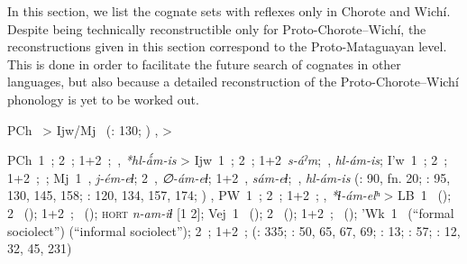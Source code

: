 \begin{adjustwidth}{6mm}{0pt}
\largerpage
In this section, we list the cognate sets with reflexes only in Chorote and Wichí. Despite being technically reconstructible only for Proto-Chorote–Wichí, the reconstructions given in this section correspond to the Proto-Mataguayan level. This is done in order to facilitate the future search of cognates in other languages, but also because a detailed reconstruction of the Proto-Chorote–Wichí phonology is yet to be worked out.


PCh~ > Ijw/Mj~ (\citealt{ND09}: 130; \citealt{JC18}) {\sep}  >  \citep[72]{KC16}


PCh~1~; 2~; 1+2~;~, \textit{*hl\mbox{-}ǻm\mbox{-}is} > Ijw~1~; 2~; 1+2~\textit{s\mbox{-}áˀm};~, \textit{hl\mbox{-}ám\mbox{-}is}; I’w~1~; 2~; 1+2~;~; Mj~1~, \textit{j\mbox{-}ém\mbox{-}eɬ}; 2~, \textit{∅\mbox{-}ám\mbox{-}eɬ}; 1+2~, \textit{sám\mbox{-}eɬ};~, \textit{hl\mbox{-}ám\mbox{-}is} (\citealt{JC14b}: 90, fn. 20; \citealt{ND09}: 95, 130, 145, 158; \citealt{AG83}: 120, 134, 157, 174; \citealt{JC18}) {\sep} PW~1~; 2~; 1+2~; , \textit{*ɬ\mbox{-}ám\mbox{-}elʰ} > LB~1~ (); 2~ (); 1+2~;~ (); \textsc{hort} \textit{n\mbox{-}am\mbox{-}iɬ} [1 2]; Vej~1~ (); 2~ (); 1+2~;~ (); ’Wk~1~ (“formal sociolect”)  (“informal sociolect”); 2~; 1+2~;  (\citealt{VN14}: 335; \citealt{VU74}: 50, 65, 67, 69; \citealt{MG-MELO15}: 13; \citealt{JAA12b}: 57; \citealt{KC16}: 12, 32, 45, 231)


\end{adjustwidth}
